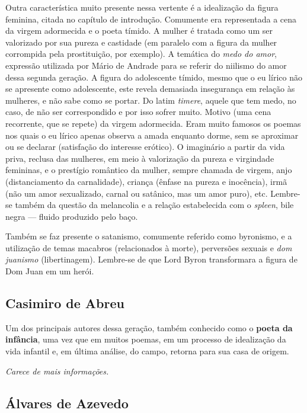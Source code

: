 Outra característica muito presente nessa vertente é a idealização da figura feminina, citada no capítulo de introdução. Comumente era representada a cena da virgem adormecida e o poeta tímido. A mulher é tratada como um ser valorizado por sua pureza e castidade (em paralelo com a figura da mulher corrompida pela prostituição, por exemplo). A temática do \textit{medo do amor}, expressão utilizada por Mário de Andrade para se referir do niilismo do amor dessa segunda geração. A figura do adolescente tímido, mesmo que o eu lírico não se apresente como adolescente, este revela demasiada insegurança em relação às mulheres, e não sabe como se portar. Do latim \textit{timere}, aquele que tem medo, no caso, de não ser correspondido e por isso sofrer muito. Motivo (uma cena recorrente, que se repete) da virgem adormecida. Eram muito famosos os poemas nos quais o eu lírico apenas observa a amada enquanto dorme, sem se aproximar ou se declarar (satisfação do interesse erótico). O imaginário a partir da vida priva, reclusa das mulheres, em meio à valorização da pureza e virgindade femininas, e o prestígio romântico da mulher, sempre chamada de virgem, anjo (distanciamento da carnalidade), criança (ênfase na pureza e inocência), irmã (não um amor sexualizado, carnal ou satânico, mas um amor puro), etc. Lembre-se também da questão da melancolia e a relação estabelecida com o \textit{spleen}, bile negra — fluido produzido pelo baço.

Também se faz presente o satanismo, comumente referido como byronismo, e a utilização de temas macabros (relacionados à morte), perversões sexuais e \textit{dom juanismo} (libertinagem). Lembre-se de que Lord Byron transformara a figura de Dom Juan em um herói.

\subsection{Casimiro de Abreu}

Um dos principais autores dessa geração, também conhecido como o \textbf{poeta da infância}, uma vez que em muitos poemas, em um processo de idealização da vida infantil e, em última análise, do campo, retorna para sua casa de origem.

\textit{Carece de mais informações.}

\subsection{Álvares de Azevedo}

